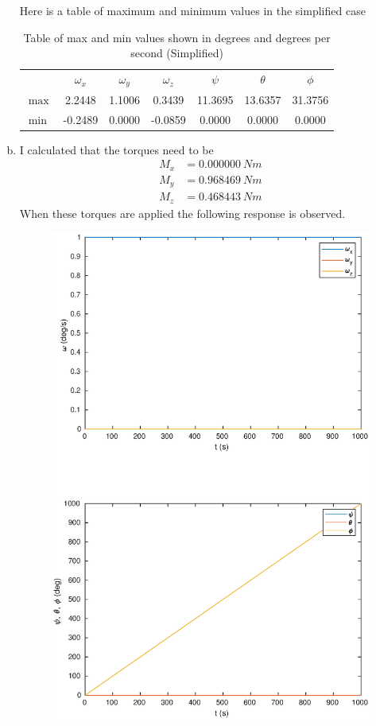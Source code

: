 \documentclass[a4paper]{article}
\begin{document}
\begin{enumerate}[a.]
    Here is a table of maximum and minimum values in the simplified case
    \begin{table}[H]
      \centering
      \begin{tabular}{lcccccc}
        & $\omega_x$ & $\omega_y$ & $\omega_z$ & $\psi$ & $\theta$ & $\phi$ \\
        $\max$ &  2.2448 & 1.1006 & 0.3439 & 11.3695 & 13.6357 & 31.3756 \\
        $\min$ & -0.2489 & 0.0000 & -0.0859 & 0.0000 & 0.0000 & 0.0000 \\
      \end{tabular}
      \caption{Table of max and min values shown in degrees and degrees per second (Simplified)}
    \end{table}
  \item I calculated that the torques need to be
    \[
      \begin{aligned}
        M_x &= 0.000000\ Nm \\
        M_y &= 0.968469\ Nm\\
        M_z &= 0.468443\ Nm
      \end{aligned}
    \]
    When these torques are applied the following response is observed.
    \begin{figure}[H]
    \begin{center}
      \includegraphics[scale=0.7]{task_c_torques.eps}

\end{center}
\end{figure}
\end{enumerate}
\end{document}
